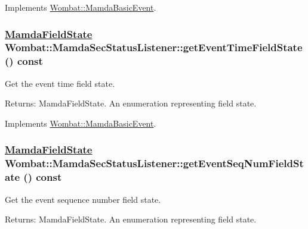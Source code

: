 Implements \hyperlink{classWombat_1_1MamdaBasicEvent_3454d51e1131d9949691ee4b4153cd97}{Wombat::Mamda\-Basic\-Event}.\hypertarget{classWombat_1_1MamdaSecStatusListener_facf6d5f611fb76e7e3e1e181f0b0d89}{
\subsubsection[getEventTimeFieldState]{\setlength{\rightskip}{0pt plus 5cm}\hyperlink{namespaceWombat_93aac974f2ab713554fd12a1fa3b7d2a}{Mamda\-Field\-State} Wombat::Mamda\-Sec\-Status\-Listener::get\-Event\-Time\-Field\-State () const}}
\label{classWombat_1_1MamdaSecStatusListener_facf6d5f611fb76e7e3e1e181f0b0d89}


Get the event time field state. 

\begin{Desc}
\item[Returns:]Mamda\-Field\-State. An enumeration representing field state. \end{Desc}


Implements \hyperlink{classWombat_1_1MamdaBasicEvent_ff3932065e16e660fb6cd9285b46f7d0}{Wombat::Mamda\-Basic\-Event}.\hypertarget{classWombat_1_1MamdaSecStatusListener_6a65bfc69736ed5d4c12e0fe161aff3d}{
\subsubsection[getEventSeqNumFieldState]{\setlength{\rightskip}{0pt plus 5cm}\hyperlink{namespaceWombat_93aac974f2ab713554fd12a1fa3b7d2a}{Mamda\-Field\-State} Wombat::Mamda\-Sec\-Status\-Listener::get\-Event\-Seq\-Num\-Field\-State () const}}
\label{classWombat_1_1MamdaSecStatusListener_6a65bfc69736ed5d4c12e0fe161aff3d}


Get the event sequence number field state. 

\begin{Desc}
\item[Returns:]Mamda\-Field\-State. An enumeration representing field state. \end{Desc}


